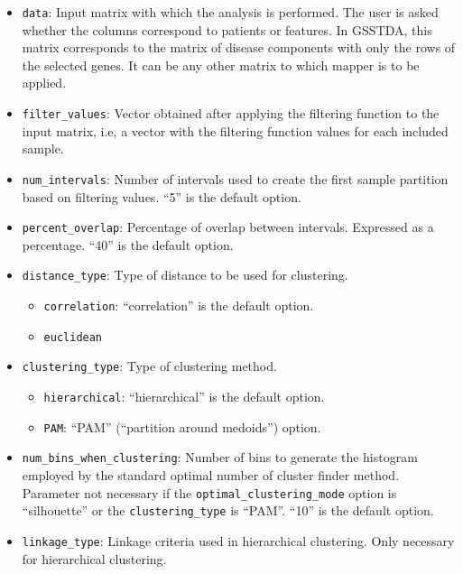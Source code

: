 \begin{itemize}
\tightlist
\item
  \texttt{data}: Input matrix with which the analysis is performed. The user is asked whether the columns correspond to patients or features. In GSSTDA, this matrix corresponds to the matrix of disease components with only the rows of the selected genes. It can be any other matrix to which mapper is to be applied.
\item
  \texttt{filter\_values}: Vector obtained after applying the filtering function to the input matrix, i.e, a vector with the filtering function values for each included sample.
\item
  \texttt{num\_intervals}: Number of intervals used to create the first sample partition based on filtering values. ``5'' is the default option.
\item
  \texttt{percent\_overlap}: Percentage of overlap between intervals. Expressed as a percentage. ``40'' is the default option.
\item
  \texttt{distance\_type}: Type of distance to be used for clustering.

  \begin{itemize}
  \tightlist
  \item
    \texttt{correlation}: ``correlation'' is the default option.
  \item
    \texttt{euclidean}
  \end{itemize}
\item
  \texttt{clustering\_type}: Type of clustering method.

  \begin{itemize}
  \tightlist
  \item
    \texttt{hierarchical}: ``hierarchical'' is the default option.
  \item
    \texttt{PAM}: ``PAM'' (``partition around medoids'') option.
  \end{itemize}
\item
  \texttt{num\_bins\_when\_clustering}: Number of bins to generate the histogram employed by the standard optimal number of cluster finder method. Parameter not necessary if the \texttt{optimal\_clustering\_mode} option is ``silhouette'' or the \texttt{clustering\_type} is ``PAM''. ``10'' is the default option.
\item
  \texttt{linkage\_type}: Linkage criteria used in hierarchical clustering. Only necessary for hierarchical clustering.


\end{itemize}
